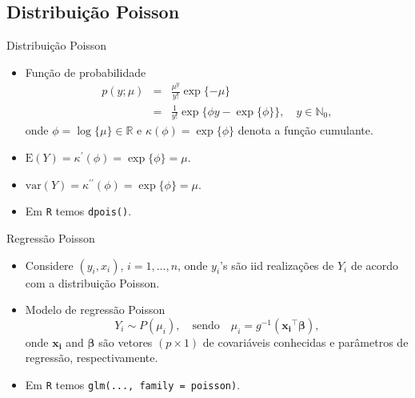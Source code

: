 

\subsection{Distribuição Poisson}

\begin{frame}{Distribuição Poisson}
\begin{itemize}
\item Função de probabilidade
\begin{eqnarray}
p(y;\mu) &=& \frac{\mu^y}{y!}\exp\{-\mu\} \nonumber \\
	     &=& \frac{1}{y!} \exp \{\phi y -  \exp\{\phi\} \}, \quad y \in \mathbb{N}_{0},
\end{eqnarray}
onde $\phi = \log \{\mu\} \in \mathbb{R}$ e $\kappa(\phi) = \exp\{\phi\}$
denota a função cumulante.
\vspace{0,5cm}
\item $\mathrm{E}(Y) = \kappa^{\prime}(\phi) = \exp\{\phi\} = \mu$. 
\vspace{0,5cm}
\item $\mathrm{var}(Y) = \kappa^{\prime \prime}(\phi) = \exp\{\phi\} = \mu$.
\vspace{0,5cm}
\item Em \texttt{R} temos \texttt{dpois()}.

\end{itemize}
\end{frame}

\begin{frame}{Regressão Poisson}
\begin{itemize}
\item Considere $(y_i, x_i)$, $i = 1,\ldots, n$, onde $y_i$'s são iid 
realizações de $Y_i$ de acordo com a distribuição Poisson.
\vspace{0,5cm}
\item Modelo de regressão Poisson
$$Y_i \sim P(\mu_i), \quad  \text{sendo} \quad \mu_i = g^{-1}(\boldsymbol{x_i}^{\top} \boldsymbol{\beta}),$$
onde $\boldsymbol{x_i}$ and $\boldsymbol{\beta}$ são vetores $(p \times 1)$
de covariáveis conhecidas e parâmetros de regressão, respectivamente.
\vspace{0,5cm}
\item Em \texttt{R} temos \texttt{glm(..., family = poisson)}.
\end{itemize}
\end{frame}
